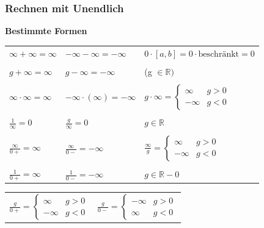 		\subsubsection{Rechnen mit Unendlich}
			\textbf{Bestimmte Formen} \\
				\begin{tabular}{lll}
					$\infty + \infty = \infty$     & $-\infty - \infty = -\infty$          & $0 \cdot [a,b] = 0 \cdot \text{beschränkt} = 0$ \\
					\\
					$g + \infty = \infty$          & $g - \infty = -\infty$                & (g $\in \mathbb{R})$ \\
					\\ 
					$\infty \cdot \infty = \infty$ & $-\infty \cdot (\infty) = -\infty$    & $g \cdot \infty = 
						\begin{cases} 
							\infty & g > 0 \\ 
							-\infty & g < 0 
						\end{cases}$\\ 		
					\\
					$\frac{1}{\infty} = 0$         & $\frac{g}{\infty} = 0$                & $g \in \mathbb{R}$	\\
					\\
					$\frac{\infty}{0+} = \infty$   & $\frac{\infty}{0-} = -\infty$	       & $\frac{\infty}{g} = 
						\begin{cases}			
							\infty & g > 0 \\
							-\infty & g < 0
						\end{cases} $ \\
					\\
					$\frac{1}{0+} = \infty$        & $\frac{1}{0-} = -\infty$              & $g \in \mathbb{R} - {0}$ \\
				\end{tabular}

				\begin{tabular}{ll}
				$\frac{g}{0+} = \begin{cases}					
								\infty & g > 0 \\
								-\infty & g < 0
								\end{cases} $ &
				$\frac{g}{0-} = \begin{cases}				
								-\infty & g > 0 \\
								\infty & g < 0
								\end{cases}$ \\ 
				\end{tabular}
			
